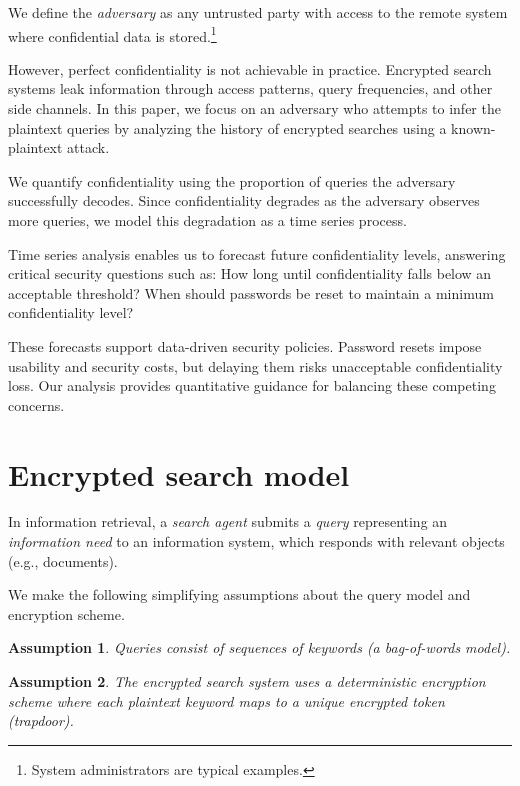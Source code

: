 \documentclass[final,11pt]{article}
\theoremstyle{plain}
\newtheorem{assumption}{Assumption}
\theoremstyle{remark}
\begin{document}
We define the \emph{adversary} as any untrusted party with access to the
remote system where confidential data is stored.\footnote{System administrators
are typical examples.}

However, perfect confidentiality is not achievable in practice. Encrypted
search systems leak information through access patterns, query frequencies,
and other side channels. In this paper, we focus on an adversary who attempts
to infer the plaintext queries by analyzing the history of encrypted searches
using a known-plaintext attack.

We quantify confidentiality using the proportion of queries the adversary
successfully decodes. Since confidentiality degrades as the adversary observes
more queries, we model this degradation as a time series process.

Time series analysis enables us to forecast future confidentiality levels,
answering critical security questions such as: How long until confidentiality
falls below an acceptable threshold? When should passwords be reset to
maintain a minimum confidentiality level?

These forecasts support data-driven security policies. Password resets impose
usability and security costs, but delaying them risks unacceptable
confidentiality loss. Our analysis provides quantitative guidance for
balancing these competing concerns.

\hypertarget{encrypted-search-model}{%
\section{Encrypted search model}\label{encrypted-search-model}}

\label{sec:es_model} In information retrieval, a \emph{search agent}
submits a \emph{query} representing an \emph{information need} to an
information system, which responds with relevant objects (e.g., documents).

We make the following simplifying assumptions about the query model and
encryption scheme.

\begin{assumption}
Queries consist of sequences of keywords (a bag-of-words model).
\end{assumption}

\begin{assumption}
The encrypted search system uses a deterministic encryption scheme where
each plaintext keyword maps to a unique encrypted token (trapdoor).
\end{assumption}
\end{document}
